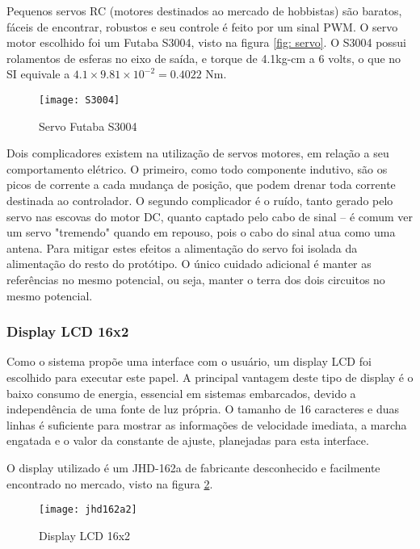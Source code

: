 \documentclass[a4paper,11pt]{article}
\begin{document}
Pequenos servos RC (motores destinados ao mercado de hobbistas) são baratos,
fáceis de encontrar, robustos e seu controle é feito por um sinal PWM. O
servo motor escolhido foi um Futaba S3004, visto na figura \ref{fig:
servo}. O S3004 possui rolamentos de esferas no eixo de saída, e torque de
4.1kg-cm a 6 volts, o que no SI equivale a $4.1 \times 9.81 \times 10^{-2} =
0.4022$ Nm.

\begin{figure}[ht]
 \begin{center}
  \texttt{[image: S3004]}
 \end{center}
 \caption{Servo Futaba S3004}
 \label{fig: servo}
\end{figure}

Dois complicadores existem na utilização de servos motores\cite{servo}, em
relação a seu comportamento elétrico. O primeiro, como todo componente indutivo,
são os picos de corrente a cada mudança de posição, que podem drenar toda
corrente destinada ao controlador. O segundo complicador é o ruído, tanto gerado
pelo servo nas escovas do motor DC, quanto captado pelo cabo de sinal -- é comum
ver um servo "tremendo" quando em repouso, pois o cabo do sinal atua como uma
antena. Para mitigar estes efeitos a alimentação do servo foi isolada da
alimentação do resto do protótipo. O único cuidado adicional é manter as
referências no mesmo potencial, ou seja, manter o terra dos dois circuitos no
mesmo potencial.

\subsubsection{Display LCD 16x2}
\label{sec:lcd}

Como o sistema propõe uma interface com o usuário, um display LCD foi escolhido
para executar este papel. A principal vantagem deste tipo de display é o baixo
consumo de energia, essencial em sistemas embarcados, devido a independência de
uma fonte de luz própria. O tamanho de 16 caracteres e duas linhas é suficiente
para mostrar as informações de velocidade imediata, a marcha engatada e o valor
da constante de ajuste, planejadas para esta interface.

O display utilizado é um JHD-162a\cite{lcd} de fabricante desconhecido e
facilmente encontrado no mercado, visto na figura \ref{fig:lcd}.
\begin{figure}[ht]
\begin{center}
 \texttt{[image: jhd162a2]}
\end{center}
  \caption{Display LCD 16x2}
  \label{fig:lcd}
\end{figure}
\end{document}
